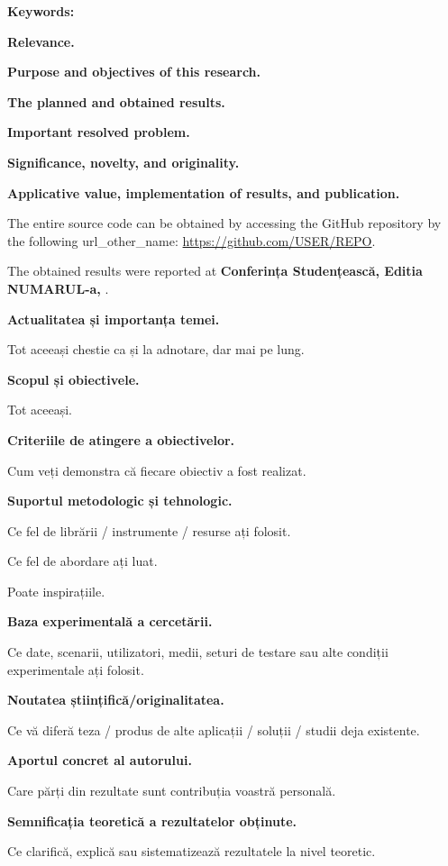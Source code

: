 \documentclass[a4paper,12pt]{report}
\newcommand{\yearOfWriting}{\the\year}
\newcommand{\conferencesList}{Conferința Studențească, Editia NUMARUL-a, \yearOfWriting}
\newcommand{\github}{\url{https://github.com/USER/REPO}}
\begin{document}
\textbf{Keywords:}
\textit{}

\textbf{Relevance.}

\textbf{Purpose and objectives of this research.}

\textbf{The planned and obtained results.}

\textbf{Important resolved problem.}

\textbf{Significance, novelty, and originality.}

\textbf{Applicative value, implementation of results, and publication.}

The entire source code can be obtained by accessing the GitHub repository
by the following \gls{url_other_name}: \github. 

The obtained results were reported at \textbf{\conferencesList}\cite{self}.

\acronymsChapter

\introChapter

\textbf{Actualitatea și importanța temei.}

Tot aceeași chestie ca și la adnotare, dar mai pe lung.

\textbf{Scopul și obiectivele.}

Tot aceeași.

\textbf{Criteriile de atingere a obiectivelor.}

Cum veți demonstra că fiecare obiectiv a fost realizat.

\textbf{Suportul metodologic și tehnologic.}

Ce fel de librării / instrumente / resurse ați folosit.

Ce fel de abordare ați luat.

Poate inspirațiile.

\textbf{Baza experimentală a cercetării.}

Ce date, scenarii, utilizatori, medii, seturi de testare sau alte condiții experimentale ați folosit.

\textbf{Noutatea științifică/originalitatea.}

Ce vă diferă teza / produs de alte aplicații / soluții / studii deja existente.

\textbf{Aportul concret al autorului.}

Care părți din rezultate sunt contribuția voastră personală.

\textbf{Semnificația teoretică a rezultatelor obținute.}

Ce clarifică, explică sau sistematizează rezultatele la nivel teoretic.
\end{document}
